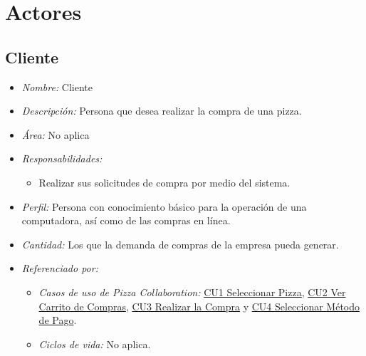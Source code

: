 
\pagebreak
\section{Actores}

	\hypertarget{A:Cliente}{}
	\subsection{Cliente}

		\begin{itemize}
			
			\item \textit{Nombre:} Cliente %
			
			\item \textit{Descripción:} Persona que desea realizar la compra de una pizza.
			
			\item \textit{Área:} No aplica
			
			\item \textit{Responsabilidades:}

				\begin{itemize}
					\item Realizar sus solicitudes de compra por medio del sistema.
				\end{itemize}

			\item \textit{Perfil:} Persona con conocimiento básico para la operación de una computadora, así como de las compras en línea.
			
			\item \textit{Cantidad:} Los que la demanda de compras de la empresa pueda generar.

			\item \textit{Referenciado por:} 
		

				\begin{itemize}
					
					\item \textit{Casos de uso de Pizza Collaboration:} \hyperlink{CU1}{CU1 Seleccionar Pizza}, \hyperlink{CU2}{CU2 Ver Carrito de Compras}, \hyperlink{CU3}{CU3 Realizar la Compra} y \hyperlink{CU4}{CU4 Seleccionar Método de Pago}.

					\item \textit{Ciclos de vida:} No aplica.

				\end{itemize}

		\end{itemize}

